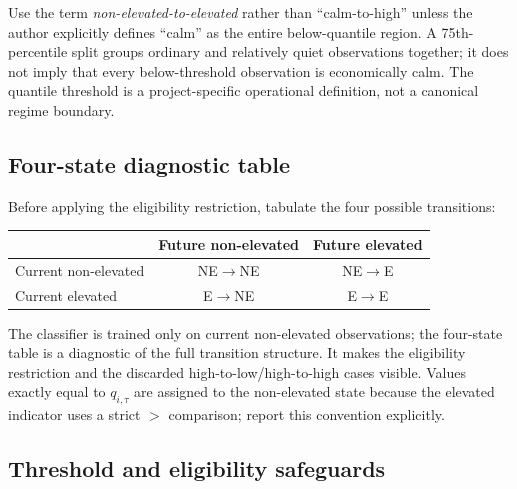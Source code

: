\documentclass[11pt,a4paper]{article}
\begin{document}
Use the term \emph{non-elevated-to-elevated} rather than ``calm-to-high'' unless the author explicitly defines ``calm'' as the entire below-quantile region. A 75th-percentile split groups ordinary and relatively quiet observations together; it does not imply that every below-threshold observation is economically calm. The quantile threshold is a project-specific operational definition, not a canonical regime boundary.

\subsection{Four-state diagnostic table}

Before applying the eligibility restriction, tabulate the four possible transitions:
\begin{center}
\begin{tabular}{lcc}
\toprule
 & Future non-elevated & Future elevated \\
\midrule
Current non-elevated & NE$\rightarrow$NE & NE$\rightarrow$E \\
Current elevated & E$\rightarrow$NE & E$\rightarrow$E \\
\bottomrule
\end{tabular}
\end{center}
The classifier is trained only on current non-elevated observations; the four-state table is a diagnostic of the full transition structure. It makes the eligibility restriction and the discarded high-to-low/high-to-high cases visible. Values exactly equal to $q_{i,\tau}$ are assigned to the non-elevated state because the elevated indicator uses a strict $>$ comparison; report this convention explicitly.

\subsection{Threshold and eligibility safeguards}
\end{document}

